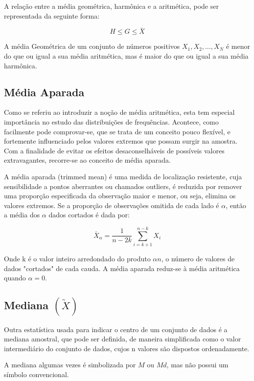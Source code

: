 A relação entre a média geométrica, harmônica e a aritmética, pode ser representada da seguinte forma:

        $$ H \leq G \leq \bar{X}  $$

A média Geométrica de um conjunto de números positivos $X_{1},X_{2},\ldots,X_{N}$ é menor do que ou igual a sua média aritmética, mas é maior do que ou igual a sua média harmônica.


\subsection{Média Aparada}


\inic Como se referiu ao introduzir a noção de média aritmética, esta tem especial
importância no estudo das distribuições de frequências.
Acontece, como facilmente pode comprovar-se, que se trata de um conceito
pouco flexível, e fortemente influenciado pelos valores extremos que possam surgir na
amostra. Com a finalidade de evitar os efeitos desaconselháveis de possíveis valores
extravagantes, recorre-se ao conceito de média aparada. \vskip0.3cm


A média aparada (trimmed mean) é uma medida de localização resistente, cuja sensibilidade a pontos aberrantes ou chamados outliers, é reduzida por remover uma proporção especificada da observação maior e menor, ou seja, elimina os valores extremos. Se a proporção de observações omitida de cada lado é $\alpha$, então a média dos $\alpha$ dados cortados é dada por:

\begin{equation}\label{aparada}
    \bar{X}_{\alpha}=\frac{1}{n-2k}\sum_{i=k+1}^{n-k}X_{i}
\end{equation}

Onde k é o valor inteiro arredondado do produto $\alpha n$, o número de valores de dados "cortados" de cada cauda. A média aparada reduz-se à média aritmética quando $\alpha = 0$.


\subsection{Mediana $(\widetilde{X})$}


\inic Outra estatística usada para indicar o centro de um conjunto de dados é a mediana amostral, que pode ser definida, de maneira simplificada como o valor intermediário do conjunto de dados, cujos n valores são dispostos ordenadamente.\vskip0.3cm


A mediana algumas vezes é simbolizada por $M$ ou $Md$, mas não possui um símbolo convencional.\vskip0.3cm



